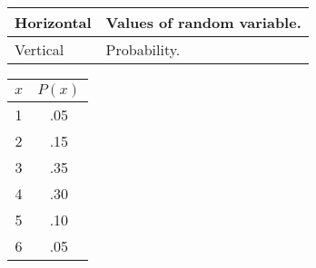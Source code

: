 \begin{table}[htbp]
    \centering
    \begin{tabular}{l|l}
        \toprule
        Horizontal & Values of random variable. \\
        \midrule
        Vertical & Probability. \\
        \bottomrule
    \end{tabular}
\end{table}

\begin{table}[htbp]
    \centering
    \begin{tabular}{c|c}
        \toprule
        $x$ & $P(x)$ \\
        \midrule
        1 & .05 \\
        \midrule
        2 & .15 \\
        \midrule
        3 & .35 \\
        \midrule
        4 & .30 \\
        \midrule
        5 & .10 \\
        \midrule
        6 & .05 \\
        \bottomrule
    \end{tabular}
\end{table}













